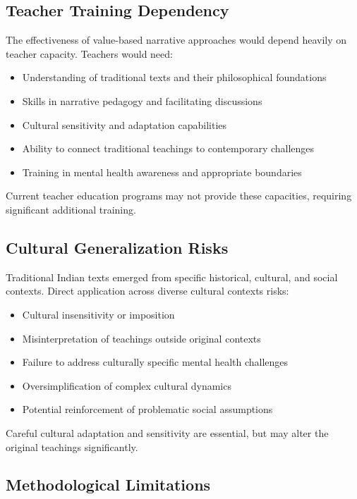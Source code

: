 \documentclass[12pt,a4paper,twocolumn]{article}
\begin{document}
\subsection{Teacher Training Dependency}

The effectiveness of value-based narrative approaches would depend heavily on teacher capacity. Teachers would need:
\begin{itemize}
    \item Understanding of traditional texts and their philosophical foundations
    \item Skills in narrative pedagogy and facilitating discussions
    \item Cultural sensitivity and adaptation capabilities
    \item Ability to connect traditional teachings to contemporary challenges
    \item Training in mental health awareness and appropriate boundaries
\end{itemize}

Current teacher education programs may not provide these capacities, requiring significant additional training.

\subsection{Cultural Generalization Risks}

Traditional Indian texts emerged from specific historical, cultural, and social contexts. Direct application across diverse cultural contexts risks:
\begin{itemize}
    \item Cultural insensitivity or imposition
    \item Misinterpretation of teachings outside original contexts
    \item Failure to address culturally specific mental health challenges
    \item Oversimplification of complex cultural dynamics
    \item Potential reinforcement of problematic social assumptions
\end{itemize}

Careful cultural adaptation and sensitivity are essential, but may alter the original teachings significantly.

\subsection{Methodological Limitations}
\end{document}
